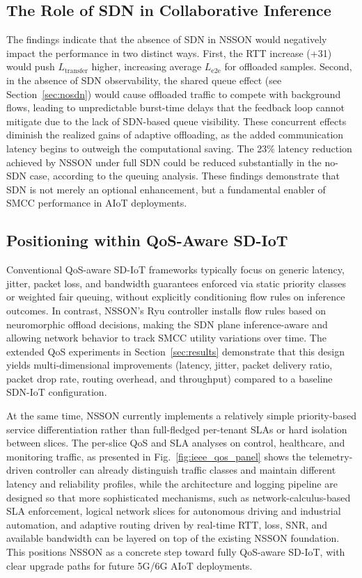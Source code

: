 \documentclass[journal]{IEEEtran}
\newcommand{\revblue}[1]{\textcolor{revblue}{#1}}
\begin{document}
\subsection{The Role of SDN in Collaborative Inference}

The findings indicate that the absence of SDN in NSSON would negatively impact the performance in two distinct ways. First, the RTT increase (+31) would push
$L_{\text{transfer}}$ higher, increasing average $L_{\text{e2e}}$ for
offloaded samples. Second, in the absence of SDN observability, the shared queue effect (see Section~\ref{sec:nosdn}) would cause offloaded traffic to compete with background flows, leading to unpredictable burst-time delays that the feedback loop cannot mitigate due to the lack of SDN-based queue visibility.
These concurrent effects diminish the realized gains of adaptive offloading, as the added communication latency begins to outweigh the computational saving. The 23\% latency reduction achieved by NSSON under full SDN could be reduced substantially in the no-SDN case, according to the queuing analysis. These findings demonstrate that SDN is not merely an optional enhancement, but a fundamental enabler of SMCC performance in AIoT deployments.

\subsection{\revblue{Positioning within QoS-Aware SD-IoT}}

\revblue{Conventional QoS-aware SD-IoT frameworks typically focus on
generic latency, jitter, packet loss, and bandwidth guarantees enforced
via static priority classes or weighted fair queuing, without explicitly
conditioning flow rules on inference outcomes. In contrast, NSSON's Ryu
controller installs flow rules based on neuromorphic offload decisions,
making the SDN plane inference-aware and allowing network behavior to
track SMCC utility variations over time. The extended QoS experiments in
Section~\ref{sec:results} demonstrate that this design yields
multi-dimensional improvements (latency, jitter, packet delivery ratio,
packet drop rate, routing overhead, and throughput) compared to a
baseline SDN-IoT configuration.}

\revblue{At the same time, NSSON currently implements a relatively simple
priority-based service differentiation rather than full-fledged
per-tenant SLAs or hard isolation between slices. The per-slice QoS and
SLA analyses on control, healthcare, and monitoring traffic, as presented in
Fig.~\ref{fig:ieee_qos_panel} shows the telemetry-driven controller can
already distinguish traffic classes and maintain different latency and
reliability profiles, while the architecture and logging pipeline are
designed so that more sophisticated mechanisms, such as
network-calculus-based SLA enforcement, logical network slices for
autonomous driving and industrial automation, and adaptive routing driven
by real-time RTT, loss, SNR, and available bandwidth can be layered on
top of the existing NSSON foundation. This positions NSSON as a concrete
step toward fully QoS-aware SD-IoT, with clear upgrade paths for future
5G/6G AIoT deployments.}
\end{document}
